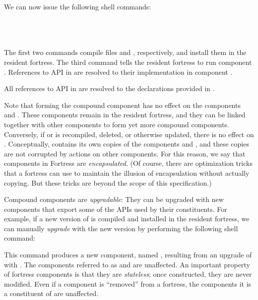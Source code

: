 We can now issue the following shell commands:

 \\
 \\
 \\

The first two commands compile files  and
,
respectively, and install them in the resident fortress. The third
command tells the resident fortress to run component .
References to API  in  are resolved to their
implementation in component .

All references to API  in  are resolved
to the declarations provided in .

Note that forming the compound component  has no effect on the
components  and .
These components remain in the resident
fortress, and they can be linked together with other components to
form yet more compound components.
Conversely, if  or  is
recompiled, deleted, or otherwise updated,
there is no effect on .
Conceptually,  contains its own copies
of the components  and ,
and these copies are not corrupted by actions on other components.
For this reason, we say that components in Fortress
are \emph{encapsulated}. (Of course, there are optimization tricks
that a fortress can use to maintain the illusion of encapsulation
without actually copying. But these tricks are beyond the scope of
this specification.)

Compound components are \emph{upgradable}: They can be upgraded with
new components that export some of the APIs used by their
constituents. For example, if a new version of  is compiled and
installed in the resident fortress,
we can manually \emph{upgrade}  with
the new version by performing the following shell command:


This command produces a new component, named ,
resulting from an upgrade of  with .
The components referred to as  and 
are unaffected. An important property of fortress components is that
they are \emph{stateless}; once constructed, they are never modified.
Even if a component is ``removed'' from a fortress, the components
it is a constituent of are unaffected.

